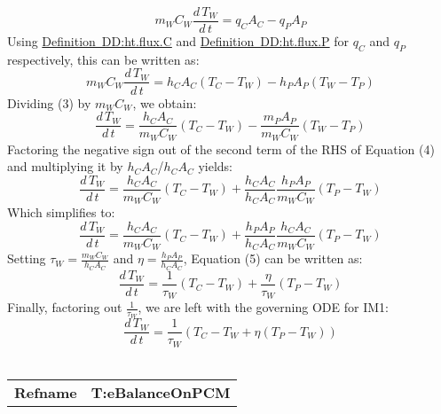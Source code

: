 \documentclass[12pt]{article}
\begin{document}
\begin{dmath}
{m_{W}} {C_{W}} \frac{d\,{T_{W}}}{d\,t}={q_{C}} {A_{C}}-{q_{P}} {A_{P}}
\end{dmath}
Using \hyperref[DD:ht.flux.C]{Definition~DD:ht.flux.C} and \hyperref[DD:ht.flux.P]{Definition~DD:ht.flux.P} for ${q_{C}}$ and ${q_{P}}$ respectively, this can be written as:
\begin{dmath}
{m_{W}} {C_{W}} \frac{d\,{T_{W}}}{d\,t}={h_{C}} {A_{C}} \left({T_{C}}-{T_{W}}\right)-{h_{P}} {A_{P}} \left({T_{W}}-{T_{P}}\right)
\end{dmath}
Dividing (3) by ${m_{W}}$${C_{W}}$, we obtain:
\begin{dmath}
\frac{d\,{T_{W}}}{d\,t}=\frac{{h_{C}} {A_{C}}}{{m_{W}} {C_{W}}} \left({T_{C}}-{T_{W}}\right)-\frac{{m_{P}} {A_{P}}}{{m_{W}} {C_{W}}} \left({T_{W}}-{T_{P}}\right)
\end{dmath}
Factoring the negative sign out of the second term of the RHS of Equation (4) and multiplying it by ${h_{C}}$${A_{C}}$/${h_{C}}$${A_{C}}$ yields:
\begin{dmath}
\frac{d\,{T_{W}}}{d\,t}=\frac{{h_{C}} {A_{C}}}{{m_{W}} {C_{W}}} \left({T_{C}}-{T_{W}}\right)+\frac{{h_{C}} {A_{C}}}{{h_{C}} {A_{C}}} \frac{{h_{P}} {A_{P}}}{{m_{W}} {C_{W}}} \left({T_{P}}-{T_{W}}\right)
\end{dmath}
Which simplifies to:
\begin{dmath}
\frac{d\,{T_{W}}}{d\,t}=\frac{{h_{C}} {A_{C}}}{{m_{W}} {C_{W}}} \left({T_{C}}-{T_{W}}\right)+\frac{{h_{P}} {A_{P}}}{{h_{C}} {A_{C}}} \frac{{h_{C}} {A_{C}}}{{m_{W}} {C_{W}}} \left({T_{P}}-{T_{W}}\right)
\end{dmath}
Setting ${τ_{W}}=\frac{{m_{W}} {C_{W}}}{{h_{C}} {A_{C}}}$ and $η=\frac{{h_{P}} {A_{P}}}{{h_{C}} {A_{C}}}$, Equation (5) can be written as:
\begin{dmath}
\frac{d\,{T_{W}}}{d\,t}=\frac{1}{{τ_{W}}} \left({T_{C}}-{T_{W}}\right)+\frac{η}{{τ_{W}}} \left({T_{P}}-{T_{W}}\right)
\end{dmath}
Finally, factoring out $\frac{1}{{τ_{W}}}$, we are left with the governing ODE for IM1:
\begin{dmath}
\frac{d\,{T_{W}}}{d\,t}=\frac{1}{{τ_{W}}} \left({T_{C}}-{T_{W}}+η \left({T_{P}}-{T_{W}}\right)\right)
\end{dmath}
~\newline
\noindent \begin{minipage}{\textwidth}
\begin{tabular}{p{} p{}}
\toprule \textbf{Refname} & \textbf{T:eBalanceOnPCM}

\end{tabular}
\end{minipage}$$
\end{document}

